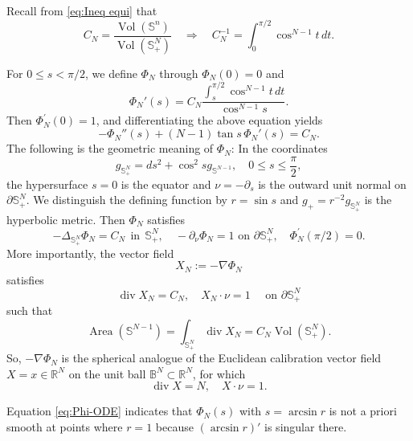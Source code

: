 \documentclass[11pt,letterpaper]{amsart}
\theoremstyle{definition}
\theoremstyle{remark}
\numberwithin{equation}{section}
\newcommand{\Sph}{\mathbb S}
\newcommand{\vol}{\operatorname{Vol}}
\begin{document}
Recall from \eqref{eq:Ineq equi} that
\begin{equation}\label{eq:C-N}
 C_N=\frac{\vol(\Sph^n)}{\vol(\Sph^{N}_+)} \quad \Rightarrow\quad 
 C_N^{-1}=\int_0^{\pi/2}\cos^{N-1}t\,dt.
\end{equation}



For $0\le s<\pi/2$, we define $\Phi_N$ through $\Phi_N(0)=0$ and
\begin{equation}\label{eq:Phi-def}
 \Phi_N'(s)=C_N\frac{\displaystyle\int_s^{\pi/2}\cos^{N-1}t\,dt}{\cos^{N-1}s}.
\end{equation}
Then $\Phi_N^{\prime}(0)=1$, and differentiating the above equation yields
\begin{equation}\label{eq:Phi-ODE}
 -\Phi_N''(s)+(N-1)\tan s\,\Phi_N'(s)=C_N.
\end{equation}
The following is the geometric meaning of $\Phi_N$: In the coordinates 
\[g_{\mathbb{S}_+^N}=d s^2+\cos ^2 s g_{\mathbb{S}^{N-1}}, \quad 0 \leq s \leq \frac{\pi}{2},\]
the hypersurface $s=0$ is the equator and $\nu=-\partial_s$ is the outward unit normal on $\partial \Sph_{+}^N$. We distinguish the defining function by $r=\sin s$ and $g_+=r^{-2} g_{\Sph_+^N}$ is the hyperbolic metric. Then $\Phi_N$ satisfies
\begin{equation}
-\Delta_{\Sph_{+}^N} \Phi_N=C_N \mathrm{~~in~~} \Sph_{+}^N, \quad-\partial_\nu \Phi_N=1 \text { on } \partial \Sph_{+}^N, \quad \Phi_N^{\prime}(\pi / 2)=0.
\end{equation}
More importantly, the vector field
\begin{equation}
X_N:=-\nabla \Phi_N
\end{equation}
satisfies 
\begin{equation}
\operatorname{div} X_N=C_N, \quad X_N \cdot \nu=1 \quad \text { on } \partial \Sph_{+}^N
\end{equation}
such that
\begin{equation}
\operatorname{Area}\left(\Sph^{N-1}\right)=\int_{\Sph_{+}^N} \operatorname{div} X_N=C_N \operatorname{Vol}\left(\Sph_{+}^N\right).
\end{equation}
So, $-\nabla\Phi_N$ is the spherical analogue of the Euclidean calibration vector field $X=x\in \mathbb{R}^N$ on the unit ball $\mathbb{B}^N \subset \mathbb{R}^N$, for which
\begin{equation}
\operatorname{div} X=N, \quad X \cdot \nu=1.
\end{equation}


Equation \eqref{eq:Phi-ODE} indicates that  $\Phi_N(s)$ with $s=\arcsin r$ is not a priori smooth at points where $r=1$ because  $(\arcsin r)'$ is singular there. 
\end{document}
